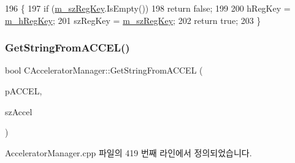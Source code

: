 \begin{DoxyCode}
196 \{
197   \textcolor{keywordflow}{if} (\mbox{\hyperlink{class_c_accelerator_manager_a03a6d0e43bcfb63cf1a23ad12cb5aa35}{m\_szRegKey}}.IsEmpty())
198     \textcolor{keywordflow}{return} \textcolor{keyword}{false};
199 
200   hRegKey = \mbox{\hyperlink{class_c_accelerator_manager_a2652d64c947f7f3474b3aa054861b34b}{m\_hRegKey}};
201   szRegKey = \mbox{\hyperlink{class_c_accelerator_manager_a03a6d0e43bcfb63cf1a23ad12cb5aa35}{m\_szRegKey}};
202   \textcolor{keywordflow}{return} \textcolor{keyword}{true};
203 \}
\end{DoxyCode}
\mbox{\label{class_c_accelerator_manager_a5e861b03f3647e8c4998c49ccd4d8928}} 
\subsubsection{\texorpdfstring{Get\+String\+From\+A\+C\+C\+E\+L()}{GetStringFromACCEL()}\hspace{0.1cm}{\footnotesize\ttfamily [1/2]}}
{\footnotesize\ttfamily bool C\+Accelerator\+Manager\+::\+Get\+String\+From\+A\+C\+C\+EL (\begin{DoxyParamCaption}\item[{A\+C\+C\+EL $\ast$}]{p\+A\+C\+C\+EL,  }\item[{C\+String \&}]{sz\+Accel }\end{DoxyParamCaption})}



Accelerator\+Manager.\+cpp 파일의 419 번째 라인에서 정의되었습니다.


